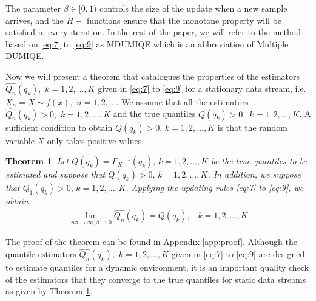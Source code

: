 \documentclass[10pt, a4paper]{article}
\newtheorem{theorem}{Theorem}
\newtheorem{rational for conjecture}{Rational for Conjecture}
\begin{document}
The parameter $\beta \in [0,1)$ controls the size of the update when a new sample arrives, and the $H-$ functions ensure that the monotone property will be satisfied in every iteration. In the rest of the paper, we will refer to the method based on \eqref{eq:7} to \eqref{eq:9} as MDUMIQE which is an abbreviation of Multiple DUMIQE.

Now we will present a theorem that catalogues the properties of the estimators $\widehat{Q_{n}}(q_k),\,\, k = 1,2,\ldots, K$ given in \eqref{eq:7} to \eqref{eq:9} for a stationary data stream, i.e. $X_n = X \sim f(x), \,\, n=1,2,\ldots$. We assume that all the estimators $\widehat{Q_{n}}(q_k) > 0,\,\, k = 1,2,\ldots, K$ and the true quantiles $Q(q_k) > 0,\,\, k = 1,2,\ldots, K$. A sufficient condition to obtain $Q(q_k) > 0,\, k = 1,2,\ldots,K$ is that the random variable $X$ only takes positive values. %
\begin{theorem}
\label{thm:positive_quantile}
Let $Q(q_k) = {F_X}^{-1}(q_k),\, k = 1,2,\ldots,K$ be the true quantiles to be estimated and suppose that $Q(q_k)> 0,\, k=1,2,\ldots,K$.
In addition, we suppose that $\widehat{Q_1}(q_k) >0,\, k = 1,2,\ldots,K$. Applying the updating rules \eqref{eq:7} to \eqref{eq:9}, we obtain:
\begin{align*}
\lim_{n \beta \to \infty, \beta \to 0}  \widehat{Q_{n}}(q_k) = Q(q_k),\,\,\,\,\, k=1,2,\ldots,K
\end{align*}
\end{theorem}
\noindent The proof of the theorem can be found in Appendix \ref{app:proof}. Although the quantile estimators $\widehat{Q_{n}}(q_k),\,\, k = 1,2,\ldots, K$ given in \eqref{eq:7} to \eqref{eq:9} are designed to estimate quantiles for a dynamic environment, it is an important quality check of the estimators that they converge to the true quantiles for static data streams as given by Theorem \ref{thm:positive_quantile}.
\end{document}
